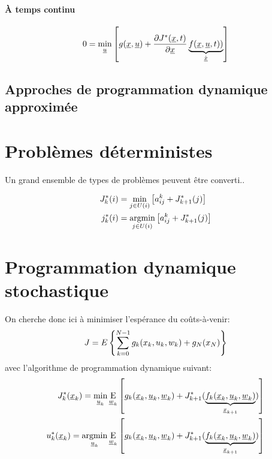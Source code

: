 \paragraph{À temps continu}

\begin{align}
0 =
\operatornamewithlimits{min}\limits_{\col{u}}
\left[
g(\col{x} , \col{u} ) + \frac{\partial	J^*(\col{x},t)}{\partial \col{x} }
\underbrace{
f(\col{x} , \col{u} , t) )
}_{\dot{\col{x}}}
\right]
\label{eq:hjb}
\end{align} 

\subsection{Approches de programmation dynamique approximée}



\newpage
\section{Problèmes déterministes}
Un grand ensemble de types de problèmes peuvent être converti..

\begin{align}
J^*_k(i) &= 
\operatornamewithlimits{min}\limits_{j \in U(i)}
\left[
a_{ij}^k + J^*_{k+1}(j)
\right] \\
j^*_k(i) &= 
\operatornamewithlimits{argmin}\limits_{j \in U(i)}
\left[
a_{ij}^k + J^*_{k+1}(j)
\right] 
\label{eq:exactdpgraph}
\end{align} 


\newpage
\section{Programmation dynamique stochastique}


On cherche donc ici à minimiser l'espérance du coûts-à-venir:
\begin{align}
    J = \large{E} \left\{ \sum_{k=0}^{N-1} g_k(x_k, u_k , w_k) + g_N( x_N ) \right\}
\end{align}
avec l'algorithme de programmation dynamique suivant:
\begin{align}
J^*_k(\col{x}_k) = 
\operatornamewithlimits{min}\limits_{\col{u}_k}
\operatornamewithlimits{E}\limits_{\col{w}_k}
\left[
g_k(\col{x}_k , \col{u}_k , \col{w}_k ) + J^*_{k+1}( 
\underbrace{
f_k(\col{x}_k , \col{u}_k , \col{w}_k ) 
}_{\col{x}_{k+1}}
)
\right] \\
u^*_k(\col{x}_k) = 
\operatornamewithlimits{argmin}\limits_{\col{u}_k}
\operatornamewithlimits{E}\limits_{\col{w}_k}
\left[
g_k(\col{x}_k , \col{u}_k , \col{w}_k) + J^*_{k+1}( 
\underbrace{
f_k(\col{x}_k , \col{u}_k , \col{w}_k) 
}_{\col{x}_{k+1}}
)
\right] 
\end{align} 


